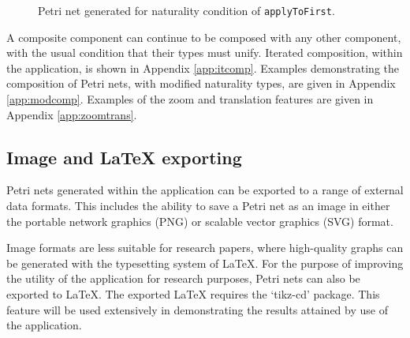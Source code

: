 \documentclass[../Dissertation.tex]{subfiles}
\begin{document}
\begin{figure}[H]
\begin{center}
\end{center}
\caption{Petri net generated for naturality condition of \lstinline{applyToFirst}.}
\label{fig:applytofirstimg}
\end{figure}

A composite component can continue to be composed with any other component, with the usual condition that their types must unify. Iterated composition, within the application, is shown in Appendix \ref{app:itcomp}. Examples demonstrating the composition of Petri nets, with modified naturality types, are given in Appendix \ref{app:modcomp}. Examples of the zoom and translation features are given in Appendix \ref{app:zoomtrans}.

\subsection{Image and LaTeX exporting}
Petri nets generated within the application can be exported to a range of external data formats. This includes the ability to save a Petri net as an image in either the portable network graphics (PNG) or scalable vector graphics (SVG) format.
\par
Image formats are less suitable for research papers, where high-quality graphs can be generated with the typesetting system of LaTeX. For the purpose of improving the utility of the application for research purposes, Petri nets can also be exported to LaTeX. The exported LaTeX requires the `tikz-cd' package. This feature will be used extensively in demonstrating the results attained by use of the application.
\end{document}
